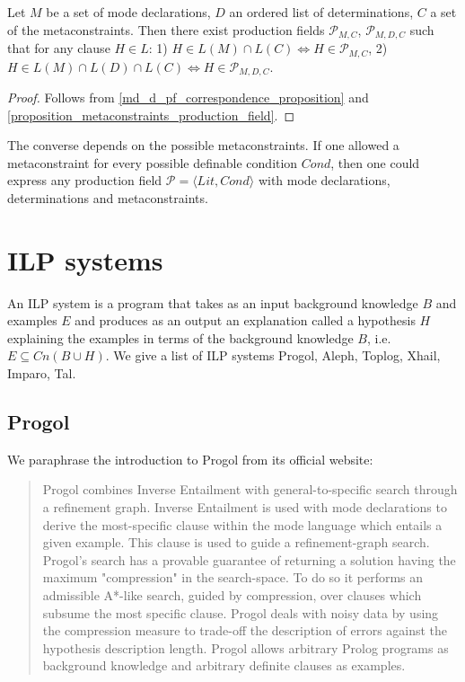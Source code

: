 \begin{corollary}
Let $M$ be a set of mode declarations, $D$ an ordered list of determinations, $C$ a set of the metaconstraints.
Then there exist production fields
$\mathcal{P}_{M,C}$,
$\mathcal{P}_{M,D,C}$
such that for any clause $H \in L$:
1) $H \in L(M) \cap L(C) \iff H \in \mathcal{P}_{M,C}$,
2) $H \in L(M) \cap L(D) \cap L(C) \iff H \in \mathcal{P}_{M,D,C}$.
\end{corollary}
\begin{proof}
Follows from \ref{md_d_pf_correspondence_proposition} and \ref{proposition_metaconstraints_production_field}.
\end{proof}

The converse depends on the possible metaconstraints. If one allowed a metaconstraint for every possible definable condition $Cond$, then one could express any production field $\mathcal{P}=\langle Lit, Cond \rangle$ with mode declarations, determinations and metaconstraints.

\section{ILP systems}
An ILP system is a program that takes as an input background knowledge $B$ and examples $E$ and produces as an output an explanation called a hypothesis $H$ explaining the examples in terms of the background knowledge $B$, i.e. $E \subseteq Cn(B \cup H)$.
We give a list of ILP systems Progol, Aleph, Toplog, Xhail, Imparo, Tal.

\subsection{Progol}
We paraphrase the introduction to Progol from its official website\cite{muggleton1999progolWebsite}:
\begin{quote}
Progol combines Inverse Entailment with general-to-specific search through a refinement graph. Inverse Entailment is used with mode declarations to derive the most-specific clause within the mode language which entails a given example. This clause is used to guide a refinement-graph search. Progol's search has a provable guarantee of returning a solution having the maximum "compression" in the search-space. To do so it performs an admissible A*-like search, guided by compression, over clauses which subsume the most specific clause. Progol deals with noisy data by using the compression measure to trade-off the description of errors against the hypothesis description length. Progol allows arbitrary Prolog programs as background knowledge and arbitrary definite clauses as examples.
\end{quote}

